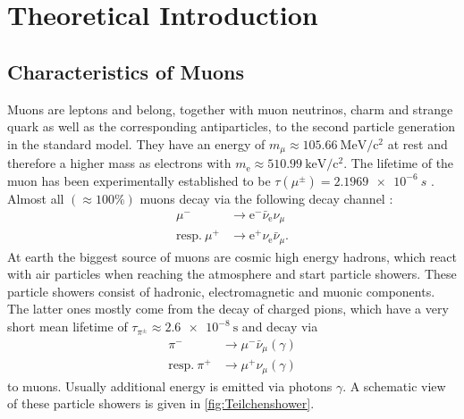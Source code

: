 
\chapter{Theoretical Introduction}
\label{cha:Theorie}

\section{Characteristics of Muons}

Muons are leptons and belong, together with muon neutrinos, charm and strange quark as well as the corresponding antiparticles, to the second particle generation in the standard model.
They have an energy of $m_{\mu} \approx \qty{105.66}{\mega\electronvolt}/\mathrm{c}^2$\cite{PDG} at rest and therefore a higher mass as electrons with $m_{\mathrm{e}} 
\approx \qty{510.99}{\kilo\electronvolt}/\mathrm{c}^2$\cite{PDG}. The lifetime of the muon has been experimentally established to be $\tau(\mu^{\pm}) = \qty{2.1969e-6}{s} $ \cite{PDG}.\\
Almost all  $(\approx 100 \%)$ muons decay via the following decay channel \cite{PDG}:
\begin{align}
    \mu^{-} &\rightarrow \mathrm{e}^{-} \bar{\nu}_{\mathrm{e}}\nu_{\mu} \\
    \mathrm{resp.} \ \mu^{+} &\rightarrow \mathrm{e}^{+}\nu_{\mathrm{e}} \bar{\nu}_{\mu}.
\end{align}
At earth the biggest source of muons are cosmic high energy hadrons, which react with air particles when reaching the atmosphere and start particle showers.
These particle showers consist of hadronic, electromagnetic and muonic components. The latter ones mostly come from the decay of charged pions, which have a
very short mean lifetime of $\tau_{\pi^{\pm}} \approx \qty{2.6e-8}{\second}$\cite{PDG} and decay via
\begin{align}
    \pi^{-} &\rightarrow \mu^{-} \bar{\nu}_{\mu} (\gamma)\\
    \mathrm{resp.} \ \pi^{+} &\rightarrow \mu^{+} {\nu}_{\mu} (\gamma)
\end{align}
to muons. Usually additional energy is emitted via photons $\gamma$. A schematic view of these particle showers is given in \autoref{fig:Teilchenshower}.\\

